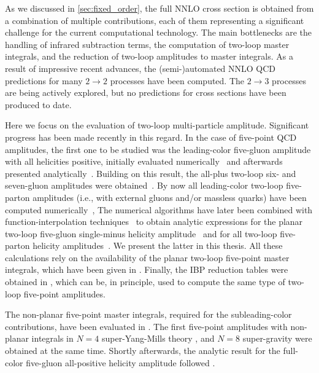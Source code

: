 As we discussed in \cref{sec:fixed_order}, the full NNLO cross section 
is obtained from a combination of multiple contributions, each of them
representing a significant challenge for the current computational technology.
The main bottlenecks are
the handling of infrared subtraction terms,
the computation of two-loop master integrals, 
and the reduction of two-loop amplitudes to master integrals.
As a result of impressive recent advances, the (semi-)automated NNLO QCD predictions for
many $2\to2$ processes have been computed.
The $2\to3$ processes are being actively explored, but no predictions for cross sections have been produced to date.

Here we focus on the evaluation of two-loop multi-particle amplitude.
Significant progress has been made recently in this regard.
In the case of five-point QCD amplitudes, the first one to be studied
was the leading-color five-gluon amplitude with all helicities positive, initially
evaluated numerically~\cite{Badger:2013gxa} and  
afterwards presented analytically~\cite{Gehrmann:2015bfy,Dunbar:2016aux}.
Building on this result, the all-plus two-loop six- and seven-gluon amplitudes were
obtained~\cite{Dunbar:2016gjb,Dunbar:2017nfy}.
By now all leading-color
two-loop five-parton amplitudes (i.e., with external gluons and/or
massless quarks) have been computed
numerically~\cite{Badger:2017jhb, Abreu:2017hqn, Badger:2018gip, Abreu:2018jgq},
The numerical algorithms have later been combined with
function-interpolation techniques~\cite{Peraro:2019svx,Peraro:2016wsq,Klappert:2019emp} to obtain
analytic expressions for the planar two-loop five-gluon single-minus helicity
amplitude~\cite{Badger:2018enw} and for all two-loop five-parton helicity
amplitudes~\cite{Abreu:2018zmy,Abreu:2019odu}.
We present the latter in this thesis.
All these calculations rely on the availability of the planar two-loop five-point master
integrals, which have been given in \cite{Papadopoulos:2015jft,Gehrmann:2018yef}. 
Finally, the IBP reduction tables were obtained in \cite{Boels:2018nrr,Chawdhry:2018awn}, which can be, in principle, used to compute the
same type of two-loop five-point amplitudes.

The non-planar five-point master integrals, required for the subleading-color contributions,
have been evaluated in \cite{Abreu:2018aqd,Chicherin:2018old}.
The first five-point amplitudes with non-planar integrals in $N=4$ super-Yang-Mills theory \cite{Chicherin:2018yne,Abreu:2018aqd},
and $N=8$ super-gravity \cite{Chicherin:2019xeg,Abreu:2019rpt}
were obtained at the same time.
Shortly afterwards, the analytic result for the full-color five-gluon all-positive helicity amplitude
followed \cite{Badger:2019djh}.

